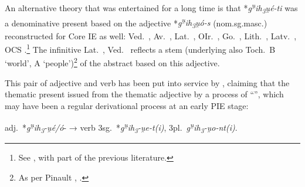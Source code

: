 \documentclass[output=paper,colorlinks,citecolor=brown]{langscibook}
\begin{document}
An alternative theory that was entertained for a long time is that   \mbox{*\textit{g\textsuperscript{u̯}ih\textsubscript{3}u̯é-ti}} was a denominative present based on the adjective    *\textit{g\textsuperscript{u̯}}\textit{ih\textsubscript{3}u̯ó-s} (nom.sg.masc.) reconstructed for Core IE as well: Ved.\  , Av.\  , Lat.\   , OIr.\  , Go.\ , Lith.\ , Latv.\ , OCS .\footnote{See \citealt[55]{Tichy2004}, with part of the previous literature.} The infinitive Lat.\  , Ved.\   reflects a stem  (underlying also Toch.\ B  ‘world’, A  ‘people’)\footnote{As per Pinault \citeyear[234]{Pinault2008}, \citeyear[117]{Pinault2021}.} of the abstract based on this adjective. 

This pair of adjective and verb has been put into service by \citet[273--277]{VillanuevaSvensson2021}, claiming that the thematic present issued from the thematic adjective by a process of “”, which may have been a regular derivational process at an early PIE stage:

\begin{exe}
   \ex adj.\ *\textit{g\textsuperscript{u̯}ih\textsubscript{3}-u̯é/ó}- → verb 3sg.\ *\textit{g\textsuperscript{u̯}ih\textsubscript{3}-u̯e-t(i)}, 3pl.\ \*\textit{g\textsuperscript{u̯}ih\textsubscript{3}-u̯o-nt(i)}. 
\end{exe}
\end{document}
